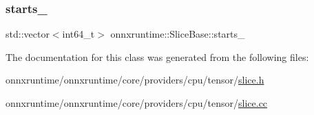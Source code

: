 \subsubsection{\texorpdfstring{starts\+\_\+}{starts\_}}
{\footnotesize\ttfamily std\+::vector$<$int64\+\_\+t$>$ onnxruntime\+::\+Slice\+Base\+::starts\+\_\+\hspace{0.3cm}{\ttfamily [protected]}}



The documentation for this class was generated from the following files\+:\begin{DoxyCompactItemize}
\item 
onnxruntime/onnxruntime/core/providers/cpu/tensor/\mbox{\hyperlink{cpu_2tensor_2slice_8h}{slice.\+h}}\item 
onnxruntime/onnxruntime/core/providers/cpu/tensor/\mbox{\hyperlink{cpu_2tensor_2slice_8cc}{slice.\+cc}}\end{DoxyCompactItemize}
